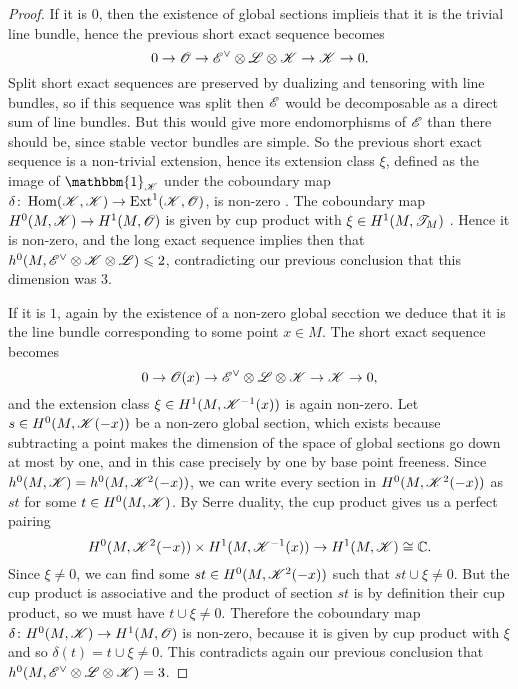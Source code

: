 \documentclass[A4paper, 12pt, british, reqno]{amsart}
\DeclareMathOperator{\Hom}{Hom}
\DeclareMathOperator{\Ext}{Ext}
\newcommand{\ot}{\otimes}
\newcommand{\dual}{^{\vee}}
\newcommand{\1}{\mathbbm{1}}
\begin{document}
\begin{lm}
\begin{proof}
	\color{gray}
	If it is $0$, then the existence of global sections implieis that it is the trivial line bundle, hence the previous short exact sequence becomes
	\[ 0\to \O\to \E\dual\ot\L\ot\sK\to \sK\to 0. \]
	Split short exact sequences are preserved by dualizing and tensoring with line bundles, so if this sequence was split then $\mathscr{E}$ would be decomposable as a direct sum of line bundles.
	But this would give more endomorphisms of $\mathscr{E}$ than there should be, since stable vector bundles are simple.
	So the previous short exact sequence is a non-trivial extension, hence its extension class $\xi$, defined as the image of $\1_{\sK}$ under the coboundary map $\delta\colon \Hom(\sK,\sK)\to \Ext^{1}(\sK,\O)$, is non-zero \cite[Exercise III.6.1]{har77}.
	The coboundary map $H^{0}(M,\mathscr{K})\to H^{1}(M,\mathscr{O})$ is given by cup product with $\xi\in H^{1}(M,\mathscr{T}_{M})$ \cite[Theorem II.7.1]{bre97}.
	Hence it is non-zero, and the long exact sequence implies then that $h^{0}(M,\E\dual\ot \sK\ot\L)\leqslant 2$, contradicting our previous conclusion that this dimension was $3$.

	If it is $1$, again by the existence of a non-zero global secction we deduce that it is the line bundle corresponding to some point $x\in M$.
	The short exact sequence becomes
	\[ 0\to \O(x)\to \E\dual\ot\L\ot\sK\to \sK\to 0, \]
	and the extension class $\xi\in H^{1}(M,\mathscr{K}^{-1}(x))$ is again non-zero.
	Let $s\in H^{0}(M,\mathscr{K}(-x))$ be a non-zero global section, which exists because subtracting a point makes the dimension of the space of global sections go down at most by one, and in this case precisely by one by base point freeness.
	Since $h^{0}(M,\mathscr{K})=h^{0}(M,\mathscr{K}^{2}(-x))$, we can write every section in $H^{0}(M,\mathscr{K}^{2}(-x))$ as $st$ for some $t\in H^{0}(M,\mathscr{K})$.
	By Serre duality, the cup product gives us a perfect pairing
	\[ H^{0}(M,\mathscr{K}^{2}(-x))\times H^{1}(M,\mathscr{K}^{-1}(x))\to H^{1}(M,\mathscr{K})\cong \mathbb{C}. \]
	Since $\xi\neq 0$, we can find some $st\in H^{0}(M,\mathscr{K}^{2}(-x))$ such that $st\cup \xi\neq 0$.
	But the cup product is associative \cite[Proposition II.7.3]{bre97} and the product of section $st$ is by definition their cup product, so we must have $t\cup \xi\neq 0$.
	Therefore the coboundary map $\delta\colon H^{0}(M,\mathscr{K})\to H^{1}(M,\mathscr{O})$ is non-zero, because it is given by cup product with $\xi$ \cite[Theorem II.7.1]{bre97} and so $\delta(t)=t\cup \xi \neq 0$.
	This contradicts again our previous conclusion that $h^{0}(M,\E\dual\ot \L\ot \sK)=3$.
    \end{proof}
\end{lm}
\end{document}

